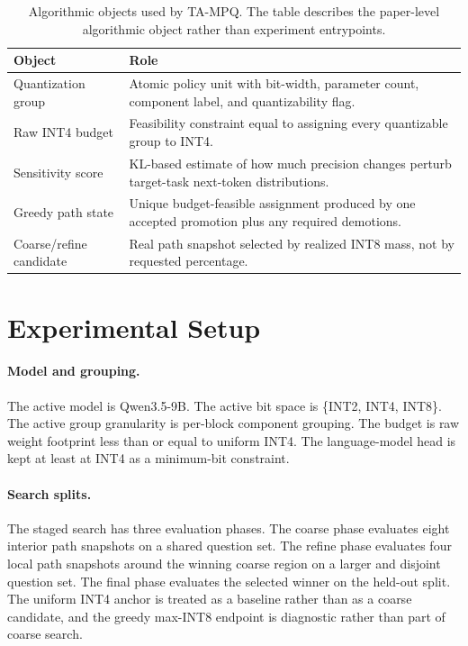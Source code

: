 \documentclass{article}
\newcommand{\method}{TA-MPQ}
\newcommand{\inttwo}{INT2}
\newcommand{\intfour}{INT4}
\newcommand{\inteight}{INT8}
\begin{document}
\begin{table}[t]
\caption{Algorithmic objects used by \method{}. The table describes the paper-level algorithmic object rather than experiment entrypoints.}
\label{tab:algorithmic-objects}
\centering
\begin{tabular}{p{}p{}}
\toprule
Object & Role \\
\midrule
Quantization group & Atomic policy unit with bit-width, parameter count, component label, and quantizability flag. \\
Raw \intfour{} budget & Feasibility constraint equal to assigning every quantizable group to \intfour{}. \\
Sensitivity score & KL-based estimate of how much precision changes perturb target-task next-token distributions. \\
Greedy path state & Unique budget-feasible assignment produced by one accepted promotion plus any required demotions. \\
Coarse/refine candidate & Real path snapshot selected by realized \inteight{} mass, not by requested percentage. \\
\bottomrule
\end{tabular}
\end{table}

\section{Experimental Setup}

\paragraph{Model and grouping.}
The active model is Qwen3.5-9B. The active bit space is \{\inttwo{}, \intfour{}, \inteight{}\}. The active group granularity is per-block component grouping. The budget is raw weight footprint less than or equal to uniform \intfour{}. The language-model head is kept at least at \intfour{} as a minimum-bit constraint.

\paragraph{Search splits.}
The staged search has three evaluation phases. The coarse phase evaluates eight interior path snapshots on a shared question set. The refine phase evaluates four local path snapshots around the winning coarse region on a larger and disjoint question set. The final phase evaluates the selected winner on the held-out split. The uniform \intfour{} anchor is treated as a baseline rather than as a coarse candidate, and the greedy max-\inteight{} endpoint is diagnostic rather than part of coarse search.
\end{document}
